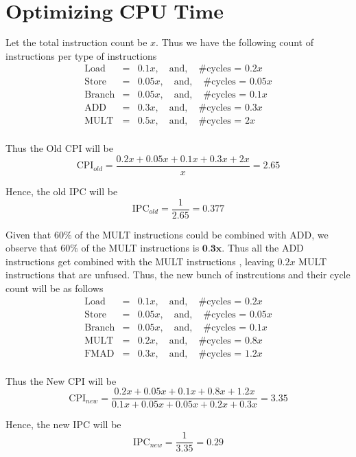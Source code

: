 \documentclass{tufte-handout}
\begin{document}
\newpage
\section{$\textbf{Optimizing CPU Time}$}
	Let the total instruction count be $x$. Thus we have the following count of instructions per type of instructions
	\begin{eqnarray*}
		\mbox{Load} &=& 0.1 x, \quad\mbox{and}, \quad\mbox{\# cycles = } 0.2x \\
		\mbox{Store} &=& 0.05 x, \quad\mbox{and}, \quad\mbox{\# cycles = } 0.05x \\
		\mbox{Branch} &=& 0.05 x, \quad\mbox{and}, \quad\mbox{\# cycles = } 0.1x \\
		\mbox{ADD} &=& 0.3 x, \quad\mbox{and}, \quad\mbox{\# cycles = } 0.3x \\
		\mbox{MULT} &=& 0.5 x, \quad\mbox{and}, \quad\mbox{\# cycles = } 2x \\
	\end{eqnarray*}

	Thus the Old CPI will be 
	\[\mbox{CPI}_{old} = \dfrac{0.2x + 0.05x + 0.1x + 0.3x + 2x}{x} = 2.65 \]

	Hence, the old IPC will be
	\[\mbox{IPC}_{old} = \dfrac{1}{2.65} = 0.377 \]

	Given that $60\%$ of the MULT instructions could be combined with ADD, we observe that $60\%$ of the MULT instructions is $\textbf{0.3x}$. Thus all the ADD instructions get combined with the MULT instructions , leaving $0.2x$ MULT instructions that are unfused. Thus, the new bunch of instrcutions and their cycle count will be as follows
	\begin{eqnarray*}
		\mbox{Load} &=& 0.1 x, \quad\mbox{and}, \quad\mbox{\# cycles = } 0.2x \\
		\mbox{Store} &=& 0.05 x, \quad\mbox{and}, \quad\mbox{\# cycles = } 0.05x \\
		\mbox{Branch} &=& 0.05 x, \quad\mbox{and}, \quad\mbox{\# cycles = } 0.1x \\
		\mbox{MULT} &=& 0.2 x, \quad\mbox{and}, \quad\mbox{\# cycles = } 0.8x \\
		\mbox{FMAD} &=& 0.3 x, \quad\mbox{and}, \quad\mbox{\# cycles = } 1.2x \\
	\end{eqnarray*}

	Thus the New CPI will be
	\[\mbox{CPI}_{new} = \dfrac{0.2x + 0.05x + 0.1x + 0.8x + 1.2x}{0.1x + 0.05x + 0.05x + 0.2x + 0.3x} = 3.35 \]

	Hence, the new IPC will be
	\[\mbox{IPC}_{new} = \dfrac{1}{3.35} = 0.29 \]
\end{document}
